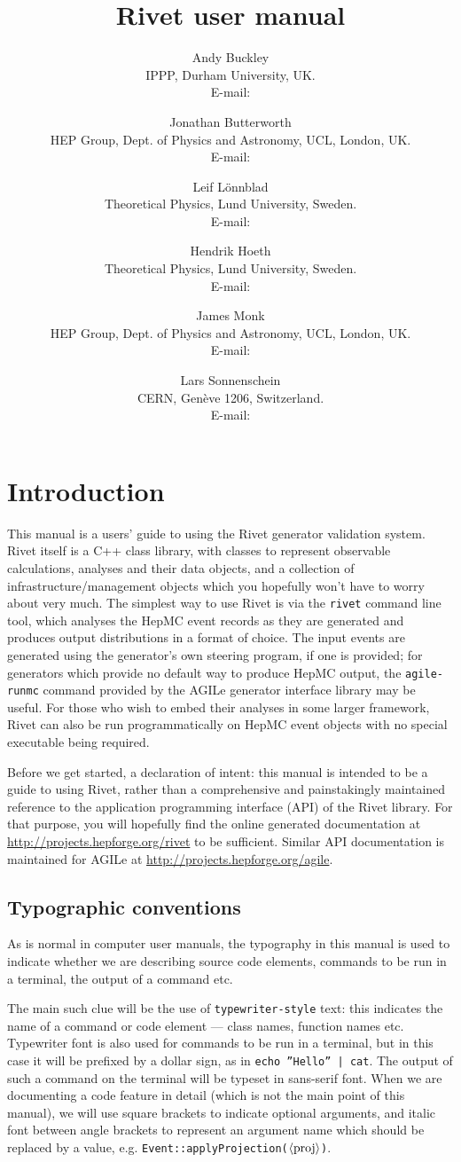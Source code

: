 \documentclass{JHEP3}
\title{Rivet user manual}
\author{Andy Buckley\\ IPPP, Durham University, UK.\\ E-mail: \email{andy.buckley@durham.ac.uk}}
\author{Jonathan Butterworth\\ HEP Group, Dept. of Physics and Astronomy, UCL, London, UK.\\ E-mail: \email{J.Butterworth@ucl.ac.uk}}
\author{Leif L\"onnblad\\ Theoretical Physics, Lund University, Sweden.\\ E-mail: \email{lonnblad@thep.lu.se}}
\author{Hendrik Hoeth\\ Theoretical Physics, Lund University, Sweden.\\ E-mail: \email{hoeth@thep.lu.se}}
\author{James Monk\\ HEP Group, Dept. of Physics and Astronomy, UCL, London, UK.\\ E-mail: \email{jmonk@hep.ucl.ac.uk}}
\author{Lars Sonnenschein\\ CERN, Gen\`eve 1206, Switzerland.\\ E-mail: \email{sonne@cern.ch}}
\newcommand{\kbd}[1]{\texttt{#1}\xspace}
\newcommand{\inp}[1]{\textsf{\textdollar}\hspace{1mm}\texttt{#1}\xspace}
\newcommand{\outp}[1]{\textsf{#1}\xspace}
\newcommand{\code}[1]{\texttt{#1}\xspace}
\newcommand{\val}[1]{\textit{\ensuremath{\langle\text{\textrm{#1}\/}\rangle}}\xspace}
\begin{document}
 


\section{Introduction}
This manual is a users' guide to using the Rivet generator validation
system. Rivet itself is a C++ class library, with classes to represent
observable calculations, analyses and their data objects, and a collection of
infrastructure/management objects which you hopefully won't have to worry about
very much. The simplest way to use Rivet is via the \kbd{rivet} command line
tool, which analyses the HepMC event records as they are generated and produces
output distributions in a format of choice. The input events are generated using
the generator's own steering program, if one is provided; for generators which
provide no default way to produce HepMC output, the \kbd{agile-runmc} command
provided by the AGILe generator interface library may be useful. For those who
wish to embed their analyses in some larger framework, Rivet can also be run
programmatically on HepMC event objects with no special executable being
required.

Before we get started, a declaration of intent: this manual is intended to be a
guide to using Rivet, rather than a comprehensive and painstakingly maintained
reference to the application programming interface (API) of the Rivet
library. For that purpose, you will hopefully find the online generated
documentation at \url{http://projects.hepforge.org/rivet} to be
sufficient. Similar API documentation is maintained for AGILe at
\url{http://projects.hepforge.org/agile}.

\subsection{Typographic conventions}
As is normal in computer user manuals, the typography in this manual is used to
indicate whether we are describing source code elements, commands to be run in a
terminal, the output of a command etc.

The main such clue will be the use of \kbd{typewriter-style} text: this
indicates the name of a command or code element --- class names, function names
etc. Typewriter font is also used for commands to be run in a terminal, but in
this case it will be prefixed by a dollar sign, as in \inp{echo ''Hello'' |
  cat}.  The output of such a command on the terminal will be typeset in
\outp{sans-serif} font. When we are documenting a code feature in detail (which
is not the main point of this manual), we will use square brackets to indicate
optional arguments, and italic font between angle brackets to represent an
argument name which should be replaced by a value,
e.g. \code{Event::applyProjection(\val{proj})}.
\end{document}
